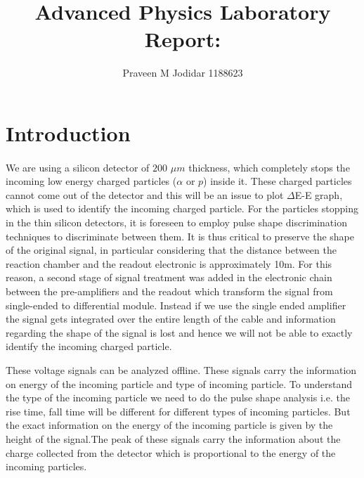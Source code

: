 \documentclass[a4paper, 11pt]{article}
\author{Praveen M Jodidar 1188623}
\title{Advanced Physics Laboratory Report:}
\begin{document}
\maketitle

\section{Introduction}
 \paragraph{}
 
We are using a silicon detector of $200$ $\mu$$m$ thickness, which completely stops the incoming low energy charged particles ($\alpha$ or $p$) inside it. These charged particles cannot come out of the detector and this will be an issue to plot $\Delta$E-E graph, which is used to identify the incoming charged particle. For the particles stopping in the thin silicon detectors, it is foreseen to employ pulse shape discrimination techniques to discriminate between them. It is thus critical to preserve the shape of the original signal, in particular considering that the distance between the reaction chamber and the readout electronic is approximately 10m. For this reason, a second stage of signal treatment was added in the electronic chain between the pre-amplifiers and the readout which transform the signal from single-ended to differential module. Instead if we use the single ended amplifier the signal gets integrated over the entire length of the cable and information regarding the shape of the signal is lost and hence we will not be able to exactly identify the incoming charged particle.
         
These voltage signals can be analyzed offline. These signals carry the information on energy of the incoming particle and type of incoming particle.  To understand the type of the incoming particle we need to do the pulse shape analysis i.e. the rise time, fall time will be different for different types of incoming particles. But the exact information on the energy of the incoming particle is given by the height of the signal.The peak of these signals carry the information about the charge collected from the detector which is proportional to the energy of the incoming particles.
 
\end{document}
